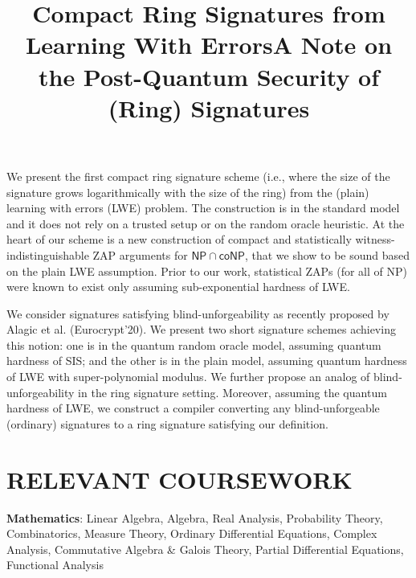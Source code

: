 \documentclass[margin]{res}
\begin{document}
\begin{resume}
\location{}
\vspace{1mm}
\title{\textbf{Compact Ring Signatures from Learning With Errors}}
\begin{position}
We present the first compact ring signature scheme (i.e., where the size of the signature grows logarithmically with the size of the ring) from the (plain) learning with errors (LWE) problem. The construction is in the standard model and it does not rely on a trusted setup or on the random oracle heuristic. At the heart of our scheme is a new construction of compact and statistically witness-indistinguishable ZAP arguments for $\mathsf{NP \cap coNP}$, that we show to be sound based on the plain LWE assumption. Prior to our work, statistical ZAPs (for all of NP) were known to exist only assuming sub-exponential hardness of LWE. 
\end{position}

\location{}
\vspace{1mm}
\title{\textbf{A Note on the Post-Quantum Security of (Ring) Signatures}}
\begin{position}
We consider signatures satisfying blind-unforgeability as recently proposed by Alagic et al. (Eurocrypt’20). We present two short signature schemes achieving this notion: one is in the quantum random oracle model, assuming quantum hardness of SIS; and the other is in the plain model, assuming quantum hardness of LWE with super-polynomial modulus. We further propose an analog of blind-unforgeability in the ring signature setting. Moreover, assuming the quantum hardness of LWE, we construct a compiler converting any blind-unforgeable (ordinary) signatures to a ring signature satisfying our definition.
\end{position}




\iffalse
\section{RELEVANT COURSEWORK}
\par
\textbf{Mathematics}:
Linear Algebra, Algebra, Real Analysis, Probability Theory, Combinatorics, Measure Theory, Ordinary Differential Equations, Complex Analysis, Commutative Algebra \& Galois Theory, Partial Differential Equations, Functional Analysis


\end{resume}
\end{document}

